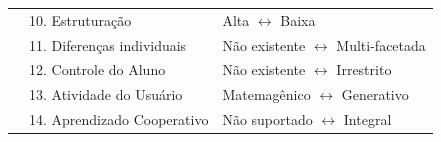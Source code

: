 \begin{table}[ht]
\begin{tabularx}{\textwidth}{m{.4cm} m{5cm} l}
        & \footnotesize{10. Estruturação}                                 & \footnotesize{Alta                     $\longleftrightarrow$ Baixa}                           \\
        & \footnotesize{11. Diferenças individuais}                       & \footnotesize{Não existente            $\longleftrightarrow$ Multi-facetada}                  \\
        & \footnotesize{12. Controle do Aluno}                            & \footnotesize{Não existente            $\longleftrightarrow$ Irrestrito}                      \\
        & \footnotesize{13. Atividade do Usuário}                         & \footnotesize{Matemagênico             $\longleftrightarrow$ Generativo}                      \\
        & \footnotesize{14. Aprendizado Cooperativo}                      & \footnotesize{Não suportado            $\longleftrightarrow$ Integral}                        \\
    
        \hline
        

\end{tabularx}
\end{table}
